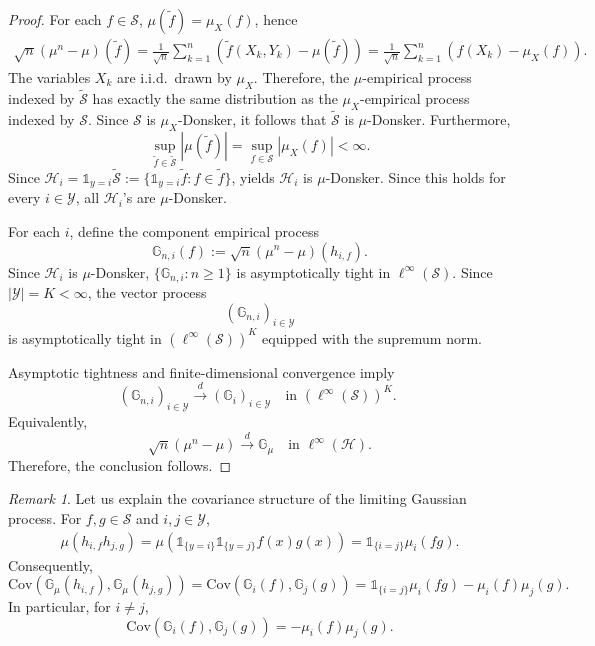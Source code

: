 \documentclass{amsart}
\theoremstyle{plain}
\numberwithin{equation}{section}\newtheorem{theorem}{Theorem}[section]
\theoremstyle{remark}
\newtheorem{remark}[theorem]{Remark}
\begin{document}
\begin{proof}
For each $f\in\mathcal{S}$, $\mu(\widetilde f) = \mu_X(f)$, hence 
\begin{align*}
    \sqrt n(\mu^n-\mu)(\widetilde f)
    =\frac1{\sqrt n}\sum_{k=1}^{n}\left(\widetilde f(X_k, Y_k)-\mu(\widetilde f)\right)=\frac1{\sqrt n}\sum_{k=1}^{n}\left(f(X_k)-\mu_X(f)\right).
\end{align*}
The variables $X_k$ are i.i.d.\ drawn by $\mu_X$.
Therefore, the $\mu$-empirical process indexed by
$\widetilde{\mathcal{S}}$ has exactly the same distribution as the
$\mu_X$-empirical process indexed by $\mathcal{S}$. Since $\mathcal{S}$ is $\mu_X$-Donsker, it follows that $\widetilde{\mathcal{S}}$ is $\mu$-Donsker. Furthermore,
\[
    \sup_{\widetilde f\in\widetilde{\mathcal{S}}}
|\mu(\widetilde f)|=\sup_{f\in\mathcal{S}}|\mu_X(f)|<\infty.
\]
Since $\mathcal{H}_i = \mathds{1}_{y=i} \widetilde{\mathcal{S}}:= \{\mathds{1}_{y=i} \widetilde{f}: f \in \widetilde{f} \}$,  yields $\mathcal{H}_i$ is $\mu$-Donsker. Since this holds for every $i \in \mathcal{Y}$, all $\mathcal H_i$'s are $\mu$-Donsker.






For each $i$, define the component empirical process 
\[
    \mathbb{G}_{n, i}(f):= \sqrt n(\mu^n-\mu)(h_{i,f}).
\]
Since $\mathcal{H}_i$ is $\mu$-Donsker, $\{\mathbb{G}_{n, i}:n\geq 1\}$ is asymptotically tight in $\ell^\infty(\mathcal{S})$. Since $|\mathcal{Y}|=K<\infty$, the vector process
\[
    (\mathbb{G}_{n,i})_{i \in \mathcal{Y}}
\]
is asymptotically tight in $\left( \ell^\infty(\mathcal{S}) \right)^K$ equipped with the supremum norm.





Asymptotic tightness and finite-dimensional convergence imply
\[
    (\mathbb{G}_{n,i})_{i \in \mathcal{Y}} \overset{d}{\longrightarrow} (\mathbb{G}_{i})_{i \in \mathcal{Y}} \quad \text{in $\left( \ell^\infty(\mathcal{S}) \right)^K$. }
\]
Equivalently,
\[
    \sqrt n(\mu^n-\mu) \overset{d}{\longrightarrow} \mathbb{G}_\mu\quad \text{in }\ell^\infty(\mathcal H).
\]
Therefore, the conclusion follows.
\end{proof}



\begin{remark}\label{rmk: covariance strucutre of Gaussian process}
Let us explain the covariance structure of the limiting Gaussian process. For $f,g\in\mathcal{S}$ and $i,j\in\mathcal{Y}$,
\begin{align*}
\mu(h_{i,f}h_{j,g})=\mu\left(
\mathds{1}_{\{y=i\}}\mathds{1}_{\{y=j\}}
f(x)g(x)\right)=\mathds{1}_{\{i=j\}}\mu_i(fg).
\end{align*}
Consequently, 
\[
    \text{Cov}\left( \mathbb{G}_\mu(h_{i,f}),\mathbb{G}_\mu(h_{j,g})
\right) = \text{Cov}\left( \mathbb{G}_i(f),\mathbb{G}_j(g)
\right)=
\mathds{1}_{\{i=j\}}\mu_i(fg)-
\mu_i(f)\mu_j(g).
\]
In particular, for $i\neq j$,
\[
    \text{Cov}\left(\mathbb{G}_i(f),\mathbb{G}_j(g)
\right)=-\mu_i(f)\mu_j(g).
\]    
\end{remark}
\end{document}
